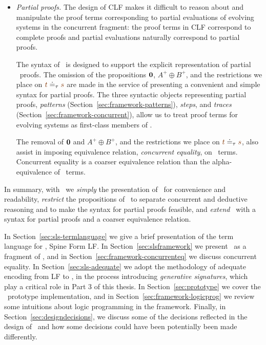 \begin{itemize}
\item{\it Partial proofs.} The design of CLF makes it difficult to
  reason about and manipulate the proof terms corresponding to partial
  evaluations of evolving systems in the concurrent fragment: the proof
  terms in CLF correspond to complete proofs and partial evaluations
  naturally correspond to partial proofs.

  The syntax of \sls~is designed to support the explicit
  representation of partial \ollll~proofs. The omission of the
  propositions $\mathbf{0}$, $A^+ \oplus B^+$, and the restrictions we
  place on $\lf{t} \doteq_\tau \lf{s}$ are made in the service of
  presenting a convenient and simple syntax for partial proofs. The
  three syntactic objects representing partial proofs, {\it patterns}
  (Section~\ref{sec:framework-patterns}), {\it steps}, and {\it
    traces} (Section~\ref{sec:framework-concurrent}), allow us to
  treat proof terms for evolving systems as first-class members of
  \sls.

  The removal of $\mathbf{0}$ and $A^+ \oplus B^+$, and the restrictions we
  place on $\lf{t} \doteq_\tau \lf{s}$, also assist in imposing
  equivalence relation, {\it concurrent equality}, on
  \sls~terms. Concurrent equality is a coarser equivalence relation
  than the alpha-equivalence of \ollll~terms.

\end{itemize}
\smallskip
\noindent
In summary, with \sls~we {\it simply} the presentation of \ollll~for
convenience and readability, {\it restrict} the propositions of
\ollll~to separate concurrent and deductive reasoning and to make the
syntax for partial proofs feasible, and {\it extend} \ollll~with a
syntax for partial proofs and a coarser equivalence relation.

In Section~\ref{sec:sls-termlanguage} we give a brief presentation of
the term language for \sls, Spine Form LF.
%
In Section~\ref{sec:slsframework} we present \sls~as a fragment of
\ollll, and in Section~\ref{sec:framework-concurrenteq} we discuss
concurrent equality. 
%
In Section~\ref{sec:sls-adequate} we adopt the methodology of adequate
encoding from LF to \sls, in the process introducing {\it generative
  signatures}, which play a critical role in Part 3 of this thesis.
%
In Section~\ref{sec:prototype} we cover the \sls~prototype
implementation, and in Section~\ref{sec:framework-logicprog} we review
some intuitions about logic programming in the framework. 
%
Finally, in Section~\ref{sec:designdecisions}, we discuss some of the
decisions reflected in the design of \sls~and how some decisions could
have been potentially been made differently.

